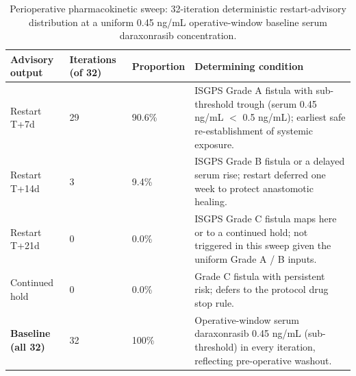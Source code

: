 \begin{table}[t]
\centering
\caption{Perioperative pharmacokinetic sweep: 32-iteration deterministic
restart-advisory distribution at a uniform 0.45 ng/mL operative-window baseline
serum daraxonrasib concentration.}
\label{tab:sec07-pk}
\begin{tabularx}{\textwidth}{L{2.5cm} L{1.9cm} L{2.0cm} Y}
\toprule
\textbf{Advisory output} & \textbf{Iterations (of 32)} & \textbf{Proportion} & \textbf{Determining condition} \\
\midrule
Restart T+7d & 29 & 90.6\% & ISGPS Grade A fistula with sub-threshold trough (serum 0.45 ng/mL $<$ 0.5 ng/mL); earliest safe re-establishment of systemic exposure. \\
Restart T+14d & 3 & 9.4\% & ISGPS Grade B fistula or a delayed serum rise; restart deferred one week to protect anastomotic healing. \\
Restart T+21d & 0 & 0.0\% & ISGPS Grade C fistula maps here or to a continued hold; not triggered in this sweep given the uniform Grade A / B inputs. \\
Continued hold & 0 & 0.0\% & Grade C fistula with persistent risk; defers to the protocol drug stop rule. \\
\midrule
\textbf{Baseline (all 32)} & 32 & 100\% & Operative-window serum daraxonrasib 0.45 ng/mL (sub-threshold) in every iteration, reflecting pre-operative washout. \\
\bottomrule
\end{tabularx}
\end{table}


